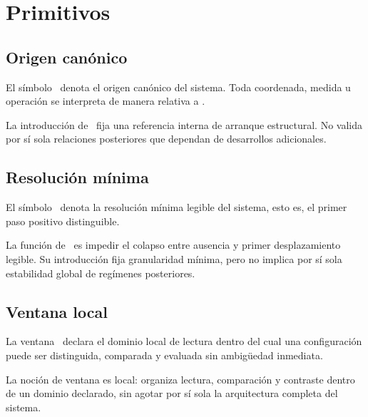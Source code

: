 \chapter{Primitivos}

\section{Origen canónico}
\begin{definition}
El símbolo \subz\ denota el origen canónico del sistema. Toda coordenada, medida u operación se interpreta de manera relativa a \subz.
\end{definition}

\begin{observation}
La introducción de \subz\ fija una referencia interna de arranque estructural. No valida por sí sola relaciones posteriores que dependan de desarrollos adicionales.
\end{observation}

\section{Resolución mínima}
\begin{definition}
El símbolo \eps\ denota la resolución mínima legible del sistema, esto es, el primer paso positivo distinguible.
\end{definition}

\begin{observation}
La función de \eps\ es impedir el colapso entre ausencia y primer desplazamiento legible. Su introducción fija granularidad mínima, pero no implica por sí sola estabilidad global de regímenes posteriores.
\end{observation}

\section{Ventana local}
\begin{definition}
La ventana \Win\ declara el dominio local de lectura dentro del cual una configuración puede ser distinguida, comparada y evaluada sin ambigüedad inmediata.
\end{definition}

\begin{observation}
La noción de ventana es local: organiza lectura, comparación y contraste dentro de un dominio declarado, sin agotar por sí sola la arquitectura completa del sistema.
\end{observation}

